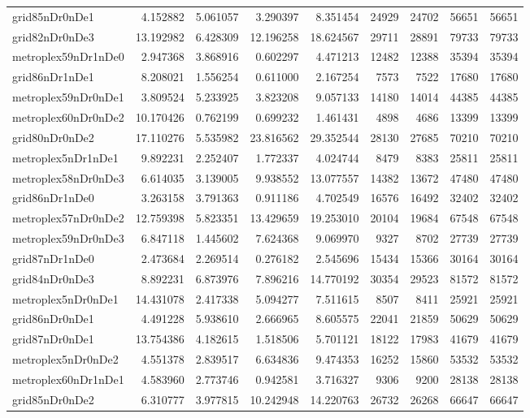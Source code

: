 \begin{longtable}{|l|r|r|r|r|r|r|r|r|}
grid85nDr0nDe1 & 4.152882 & 5.061057 & 3.290397 & 8.351454 & 24929 & 24702 & 56651 & 56651 \\
grid82nDr0nDe3 & 13.192982 & 6.428309 & 12.196258 & 18.624567 & 29711 & 28891 & 79733 & 79733 \\
metroplex59nDr1nDe0 & 2.947368 & 3.868916 & 0.602297 & 4.471213 & 12482 & 12388 & 35394 & 35394 \\
grid86nDr1nDe1 & 8.208021 & 1.556254 & 0.611000 & 2.167254 & 7573 & 7522 & 17680 & 17680 \\
metroplex59nDr0nDe1 & 3.809524 & 5.233925 & 3.823208 & 9.057133 & 14180 & 14014 & 44385 & 44385 \\
metroplex60nDr0nDe2 & 10.170426 & 0.762199 & 0.699232 & 1.461431 & 4898 & 4686 & 13399 & 13399 \\
grid80nDr0nDe2 & 17.110276 & 5.535982 & 23.816562 & 29.352544 & 28130 & 27685 & 70210 & 70210 \\
metroplex5nDr1nDe1 & 9.892231 & 2.252407 & 1.772337 & 4.024744 & 8479 & 8383 & 25811 & 25811 \\
metroplex58nDr0nDe3 & 6.614035 & 3.139005 & 9.938552 & 13.077557 & 14382 & 13672 & 47480 & 47480 \\
grid86nDr1nDe0 & 3.263158 & 3.791363 & 0.911186 & 4.702549 & 16576 & 16492 & 32402 & 32402 \\
metroplex57nDr0nDe2 & 12.759398 & 5.823351 & 13.429659 & 19.253010 & 20104 & 19684 & 67548 & 67548 \\
metroplex59nDr0nDe3 & 6.847118 & 1.445602 & 7.624368 & 9.069970 & 9327 & 8702 & 27739 & 27739 \\
grid87nDr1nDe0 & 2.473684 & 2.269514 & 0.276182 & 2.545696 & 15434 & 15366 & 30164 & 30164 \\
grid84nDr0nDe3 & 8.892231 & 6.873976 & 7.896216 & 14.770192 & 30354 & 29523 & 81572 & 81572 \\
metroplex5nDr0nDe1 & 14.431078 & 2.417338 & 5.094277 & 7.511615 & 8507 & 8411 & 25921 & 25921 \\
grid86nDr0nDe1 & 4.491228 & 5.938610 & 2.666965 & 8.605575 & 22041 & 21859 & 50629 & 50629 \\
grid87nDr0nDe1 & 13.754386 & 4.182615 & 1.518506 & 5.701121 & 18122 & 17983 & 41679 & 41679 \\
metroplex5nDr0nDe2 & 4.551378 & 2.839517 & 6.634836 & 9.474353 & 16252 & 15860 & 53532 & 53532 \\
metroplex60nDr1nDe1 & 4.583960 & 2.773746 & 0.942581 & 3.716327 & 9306 & 9200 & 28138 & 28138 \\
grid85nDr0nDe2 & 6.310777 & 3.977815 & 10.242948 & 14.220763 & 26732 & 26268 & 66647 & 66647 \\

\end{longtable}
